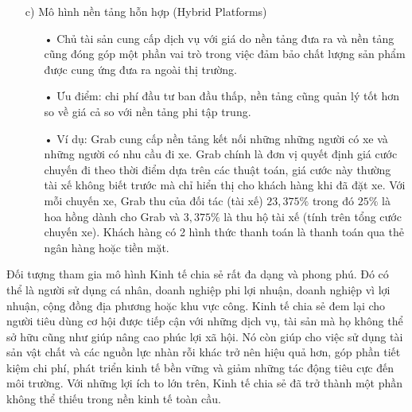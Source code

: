 \documentclass[12pt,a4paper]{report}
\begin{document}
\begin{itemize}
\begin{itemize}
\end{itemize}
\item[c)] Mô hình nền tảng hỗn hợp (Hybrid Platforms)
\begin{itemize}
\item[•] Chủ tài sản cung cấp dịch vụ với giá do nền tảng đưa ra và nền tảng cũng đóng góp một phần vai trò trong việc đảm bảo chất lượng sản phẩm được cung ứng đưa ra ngoài thị trường.
\item[•] Ưu điểm: chi phí đầu tư ban đầu thấp, nền tảng cũng quản lý tốt hơn so về giá cả so với nền tảng phi tập trung.
\item[•] Ví dụ: Grab cung cấp nền tảng kết nối những những người có xe và những người có nhu cầu đi xe. Grab chính là đơn vị quyết định giá cước chuyến đi theo thời điểm dựa trên các thuật toán, giá cước này thường tài xế không biết trước mà chỉ hiển thị cho khách hàng khi đã đặt xe. Với mỗi chuyến xe, Grab thu của đối tác (tài xế) $23,375\%$ trong đó $25\%$ là hoa hồng dành cho Grab và $3,375\%$ là thu hộ tài xế (tính trên tổng cước chuyến xe). Khách hàng có 2 hình thức thanh toán là thanh toán qua thẻ ngân hàng hoặc tiền mặt. 
\end{itemize}
\end{itemize}

Đối tượng tham gia mô hình Kinh tế chia sẻ rất đa dạng và phong phú. Đó có thể là người sử dụng cá nhân, doanh nghiệp phi lợi nhuận, doanh nghiệp vì lợi nhuận, cộng đồng địa phương hoặc khu vực công. Kinh tế chia sẻ đem lại cho người tiêu dùng cơ hội được tiếp cận với những dịch vụ, tài sản mà họ không thể sở hữu cũng như giúp nâng cao phúc lợi xã hội. Nó còn giúp cho việc sử dụng tài sản vật chất và các nguồn
lực nhàn rỗi khác trở nên hiệu quả hơn, góp phần tiết kiệm chi phí, phát triển kinh tế bền vững và giảm những tác động tiêu cực đến môi trường. Với những lợi ích to lớn trên, Kinh tế chia sẻ đã trở thành một phần không thể thiếu trong nền kinh tế toàn cầu. 
\newpage
\end{document}
